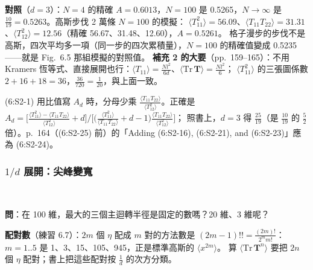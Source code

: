 \textbf{對照}（$d=3$）：$N=4$ 的精確 $A=0.6013$，$N=100$ 是 0.5265，$N\to\infty$ 是 $\frac{10}{19}=0.5263$。高斯步伐 2 萬條 $N=100$ 的模擬：
$\langle T_{11}^2\rangle=56.09$、$\langle T_{11}T_{22}\rangle=31.31$、$\langle T_{12}^2\rangle=12.56$（精確 56.67、31.48、12.60），$A=0.5261$。
格子漫步的步伐不是高斯，四次平均多一項（同一步的四次累積量），$N=100$ 的精確值變成 0.5235——就是 Fig.~6.5 那組模擬的對照值。
\textbf{補充 2 的大要}（pp.~159--165）：不用 Kramers 恆等式、直接展開也行：$\langle T_{11}\rangle=\frac{Nl^2}{6d}$、$\langle\mathrm{Tr}\,\mathbf T\rangle=\frac{Nl^2}6$；
$\langle T_{11}^2\rangle$ 的三張圖係數 $2+16+18=36$，$\frac{36}{720}=\frac1{20}$，與上面一致。
\begin{errbox}[p.~159，(6:S2-1)；p.~164]
(6:S2-1) 用比值寫 $A_d$ 時，分母少乘 $\frac{\langle T_{11}T_{22}\rangle}{\langle T_{12}^2\rangle}$。正確是
$A_d=\big[\frac{\langle T_{11}^2\rangle-\langle T_{11}T_{22}\rangle}{\langle T_{12}^2\rangle}+d\big]\big/\big[\big(\frac{\langle T_{11}^2\rangle}{\langle T_{11}T_{22}\rangle}+d-1\big)\frac{\langle T_{11}T_{22}\rangle}{\langle T_{12}^2\rangle}\big]$；
照書上，$d=3$ 得 $\frac{25}{19}$（是 $\frac{10}{19}$ 的 $\frac52$ 倍）。p.~164（(6:S2-25) 前）的「Adding (6:S2-16), (6:S2-21), and (6:S2-23)」應為 (6:S2-24)。
\end{errbox}

\subsubsection{\texorpdfstring{$1/d$}{1/d} 展開：尖峰變寬}
\leavevmode{}\ \par\nopagebreak

\textbf{問}：在 100 維，最大的三個主迴轉半徑是固定的數嗎？20 維、3 維呢？

\textbf{配對數}（練習 6.7）：$2m$ 個 $\eta$ 配成 $m$ 對的方法數是 $(2m-1)!!=\frac{(2m)!}{2^mm!}$：$m=1..5$ 是 1、3、15、105、945，正是標準高斯的 $\langle x^{2m}\rangle$。
算 $\langle\mathrm{Tr}\,\mathbf T^n\rangle$ 要把 $2n$ 個 $\eta$ 配對；書上把這些配對按 $\frac1d$ 的次方分類。

